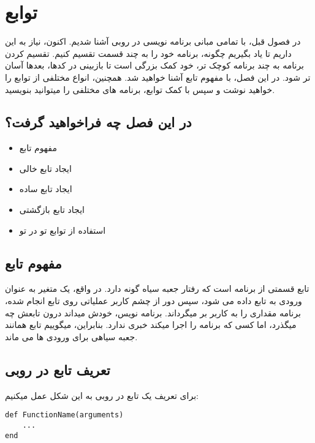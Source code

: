 \documentclass[11pt]{article}
\begin{document}
\section{توابع}
در فصول قبل، با تمامی مبانی برنامه نویسی در روبی آشنا شدیم. اکنون، نیاز به این داریم تا یاد بگیریم چگونه، برنامه خود را به چند قسمت تقسیم کنیم. تقسیم کردن برنامه به چند برنامه کوچک تر، خود کمک بزرگی است تا بازبینی در کدها، بعدها آسان تر شود. در این فصل، با مفهوم تابع آشنا خواهید شد. همچنین، انواع مختلفی از توابع را خواهید نوشت و سپس با کمک توابع، برنامه های مختلفی را میتوانید بنویسید. 
\subsection{در این فصل چه فراخواهید گرفت؟}
\begin{itemize}
\item مفهوم تابع
\item ایجاد تابع خالی
\item ایجاد تابع ساده
\item ایجاد تابع بازگشتی
\item استفاده از توابع تو در تو
\end{itemize}
\subsection{مفهوم تابع}
تابع 
قسمتی از برنامه است که رفتار جعبه سیاه
گونه دارد. در واقع، یک متغیر به عنوان ورودی به تابع داده می شود، سپس دور از چشم کاربر عملیاتی روی تابع انجام شده، برنامه مقداری را به کاربر بر میگرداند. برنامه نویس، خودش میداند درون تابعش چه میگذرد، اما کسی که برنامه را اجرا میکند خبری ندارد. بنابراین، میگوییم تابع همانند جعبه سیاهی برای ورودی ها می ماند. 
\subsection{تعریف تابع در روبی}
برای تعریف یک تابع در روبی به این شکل عمل میکنیم:

\begin{latin}
\begin{verbatim}
def FunctionName(arguments)
	...
end
\end{verbatim}
\end{latin}
\end{document}
